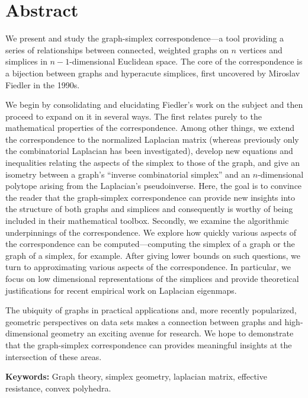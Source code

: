 \chapter*{Abstract}



We present and study the graph-simplex correspondence---a tool providing a series of relationships between connected, weighted graphs on $n$ vertices and simplices in $n-1$-dimensional Euclidean space. The core of the correspondence is a  bijection between graphs and hyperacute simplices, first uncovered by Miroslav Fiedler  in the 1990s. 



We begin by consolidating and elucidating Fiedler's  work on  the subject and then proceed to expand on it  in several  ways. The first relates purely to  the mathematical  properties  of the  correspondence. Among  other things, we extend the correspondence to the normalized Laplacian matrix (whereas previously only the combinatorial  Laplacian has been investigated), develop new equations and  inequalities relating the aspects  of the simplex to those of the graph, and give an isometry between a graph's ``inverse combinatorial  simplex''  and an $n$-dimensional polytope arising from the Laplacian's pseudoinverse. 
Here, the goal is to convince  the reader that the graph-simplex  correspondence can provide  new insights into the  structure of  both graphs and simplices and consequently is worthy of being  included in their mathematical  toolbox.  Secondly, we examine the algorithmic underpinnings of the correspondence. We explore how quickly various aspects of  the correspondence can be  computed---computing the simplex of a graph or the graph of a simplex, for example. After giving lower bounds on such questions, we turn to approximating various aspects of the correspondence. In particular, we focus on low dimensional representations of  the simplices and provide theoretical justifications for recent empirical  work on Laplacian eigenmaps. 

The ubiquity of graphs in practical applications and, more recently popularized, geometric  perspectives on data sets makes a connection  between graphs and high-dimensional  geometry an  exciting avenue for research. 
We hope to demonstrate that the  graph-simplex correspondence can provides meaningful insights at the intersection of  these  areas.  

\vspace{1cm}
\noindent \textbf{Keywords:}  Graph theory,  simplex geometry, laplacian matrix, effective resistance,  convex  polyhedra. 




